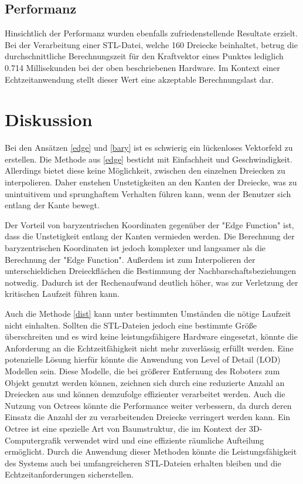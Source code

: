 \documentclass[conference]{IEEEtran}
\begin{document}
\subsection{Performanz}
Hinsichtlich der Performanz wurden ebenfalls zufriedenstellende Resultate erzielt. Bei der Verarbeitung 
einer STL-Datei, welche 160 Dreiecke beinhaltet, betrug die durchschnittliche Berechnungszeit für den 
Kraftvektor eines Punktes lediglich 0.714 Millisekunden bei der oben beschriebenen Hardware. Im Kontext 
einer Echtzeitanwendung stellt dieser Wert eine akzeptable Berechnungslast dar. 

\section{Diskussion}
Bei den Ansätzen \ref*{edge} und \ref*{bary} ist es schwierig ein lückenloses Vektorfeld zu erstellen. 
Die Methode aus \ref*{edge} besticht mit Einfachheit und Geschwindigkeit. Allerdings bietet  diese keine Möglichkeit, 
zwischen den einzelnen Dreiecken zu interpolieren. Daher enstehen Unstetigkeiten an den Kanten der Dreiecke, 
was zu unintuitivem und sprunghaftem Verhalten führen kann, wenn der Benutzer sich entlang der Kante 
bewegt.

Der Vorteil von baryzentrischen Koordinaten gegenüber der "Edge Function" ist, dass die Unstetigkeit 
entlang der Kanten vermieden werden. Die Berechnung der baryzentrischen Koordinaten ist jedoch komplexer und 
langsamer als die Berechnung der "Edge Function". Außerdem ist zum Interpolieren der unterschieldichen Dreieckflächen die 
Bestimmung der Nachbarschaftsbeziehungen notwedig. Dadurch ist der Rechenaufwand deutlich höher, was zur Verletzung 
der kritischen Laufzeit führen kann.

Auch die Methode \ref*{dist} kann unter bestimmten Umständen die nötige Laufzeit nicht einhalten. 
Sollten die STL-Dateien jedoch eine bestimmte Größe überschreiten und es wird keine leistungsfähigere 
Hardware eingesetzt, könnte die Anforderung an die Echtzeitfähigkeit nicht mehr zuverlässig erfüllt werden. 
Eine potenzielle Lösung hierfür könnte die Anwendung von Level of Detail (LOD) Modellen sein. 
Diese Modelle, die bei größerer Entfernung des Roboters zum Objekt genutzt werden können, zeichnen 
sich durch eine reduzierte Anzahl an Dreiecken aus und können demzufolge effizienter verarbeitet werden. 
Auch die Nutzung von Octrees könnte die Performance weiter verbessern, da durch deren Einsatz die Anzahl 
der zu verarbeitenden Dreiecke verringert werden kann. Ein Octree ist eine spezielle Art von Baumstruktur, 
die im Kontext der 3D-Computergrafik verwendet wird und eine effiziente räumliche Aufteilung ermöglicht. 
Durch die Anwendung dieser Methoden könnte die Leistungsfähigkeit des Systems auch bei umfangreicheren 
STL-Dateien erhalten bleiben und die Echtzeitanforderungen sicherstellen.
\end{document}
